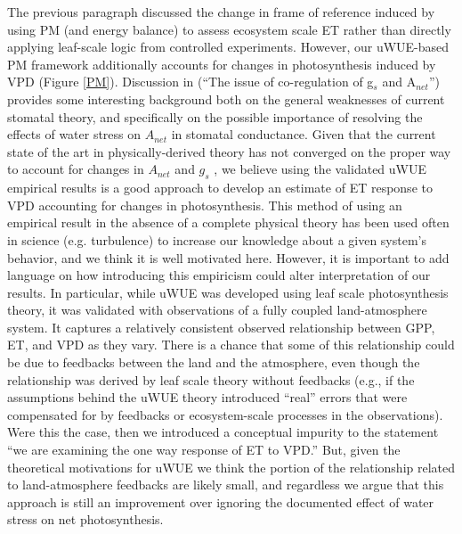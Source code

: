 \documentclass[12pt]{article}
\begin{document}
The previous paragraph discussed the change in frame of reference
induced by using PM (and energy balance) to assess ecosystem scale ET
rather than directly applying leaf-scale logic from controlled
experiments. However, our uWUE-based PM framework additionally
accounts for changes in photosynthesis induced by VPD (Figure
\ref{PM}). Discussion in \cite{Damour2010} (``The issue of
co-regulation of g$_s$ and A$_{net}$'') provides some interesting
background both on the general weaknesses of current stomatal theory,
and specifically on the possible importance of resolving the effects
of water stress on $A_{net}$ in stomatal conductance. Given that the
current state of the art in physically-derived theory has not
converged on the proper way to account for changes in $A_{net}$ and
$g_s$ \citep{Damour2010}, we believe using the validated uWUE
empirical results \citep[e.g. Figure 3,][]{Zhou_2014} is a good
approach to develop an estimate of ET response to VPD accounting for
changes in photosynthesis. This method of using an empirical result in
the absence of a complete physical theory has been used often in
science (e.g. turbulence) to increase our knowledge about a given
system's behavior, and we think it is well motivated here. However, it
is important to add language on how introducing this empiricism could
alter interpretation of our results. In particular, while uWUE was
developed using leaf scale photosynthesis theory, it was validated
with observations of a fully coupled land-atmosphere system. It
captures a relatively consistent observed relationship between GPP,
ET, and VPD as they vary. There is a chance that some of this
relationship could be due to feedbacks between the land and the
atmosphere, even though the relationship was derived by leaf scale
theory without feedbacks (e.g., if the assumptions behind the uWUE
theory introduced ``real'' errors that were compensated for by
feedbacks or ecosystem-scale processes in the observations).  Were
this the case, then we introduced a conceptual impurity to the
statement ``we are examining the one way response of ET to VPD.''
But, given the theoretical motivations for uWUE we think the portion
of the relationship related to land-atmosphere feedbacks are likely
small, and regardless we argue that this approach is still an
improvement over ignoring the documented effect of water stress on net
photosynthesis.
\end{document}

